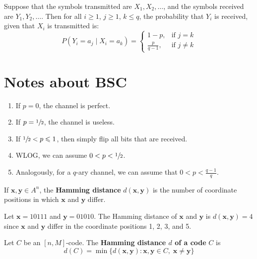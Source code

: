 Suppose that the symbols transmitted are $ X_1,X_2,\ldots $,
and the symbols received are $ Y_1,Y_2,\ldots $. Then for all
$ i\geqslant 1 $, $ j\geqslant 1 $, $ k\leqslant q $, the probability
that $ Y_i $ is received, given that $ X_i $ is transmitted is:
\[ P(Y_i=a_j\mid X_i=a_k)=
    \begin{cases}
        1-p,           & \text{if } j=k     \\
        \frac{p}{q-1}, & \text{if } j\neq k
    \end{cases} \]

\section{Notes about BSC}
\begin{enumerate}[label=(\roman*)]
    \item If $ p=0 $, the channel is perfect.
    \item If $ p=\sfrac{1}{2} $, the channel is useless.
    \item If $ \sfrac{1}{2}<p\leqslant 1 $, then simply flip all bits that are received.
    \item WLOG, we can assume $ 0<p<\sfrac{1}{2} $.
    \item Analogously, for a $ q $-ary channel, we can assume that $ 0<p<\frac{q-1}{q} $.
\end{enumerate}

\begin{defbox}
    \begin{definition}
        If $ \bm{x},\bm{y}\in A^n $, the \textbf{Hamming distance} $ d(\bm{x},\bm{y}) $ is
        the number of coordinate positions in which $ \bm{x} $ and $ \bm{y} $ differ.
    \end{definition} \end{defbox}

\begin{exbox}
    \begin{example}
        Let $ \bm{x} = 10111 $ and $ \bm{y} = 01010 $. The Hamming distance
        of $ \bm{x} $ and $ \bm{y} $ is $  d(\bm{x},\bm{y})=4  $
        since $ \bm{x} $ and $ \bm{y} $ differ in the coordinate positions
        1, 2, 3, and 5.
    \end{example}
\end{exbox}

\begin{defbox}
    \begin{definition}
        Let $ C $ be an $ [n,M] $-code.
        The \textbf{Hamming distance $ d $ of a code} $ C $ is
        \[ d(C)=\min \{d(\bm{x},\bm{y}):\bm{x},\bm{y}\in C,\;\bm{x}\neq \bm{y}\} \]
    \end{definition} \end{defbox}

